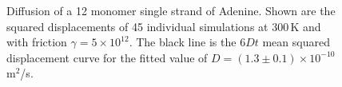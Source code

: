 \begin{figure}[htb]
       \begin{center}
               \scalebox{0.9}{
                        \nonstopmode
                        
                        \errorstopmode
                        \rule[-0.5cm]{0cm}{0cm}}
                \caption{Diffusion of a 12 monomer single strand of Adenine. Shown are the squared displacements of 45 individual simulations at 300\,K and with friction $\gamma = 5 \times 10^{12}$. The black line is the $6Dt$ mean squared displacement curve for the fitted value of $D = (1.3 \pm 0.1) \times 10^{-10}$\,m$^2$/s.}
		\label{diffusion}
        \end{center}
\end{figure}

